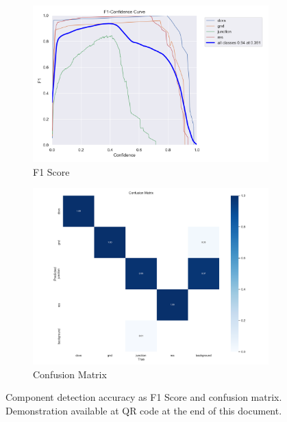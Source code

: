 \documentclass{beamer}
\begin{document}
\begin{frame}[t]
\begin{columns}[t]
\begin{column}{\colwidth}
      {\beamerblocknoheader
        \begin{block}{}
          \begin{figure}[t]
            \centering
            \begin{subfigure}{0.45\textwidth}
              \includegraphics[width=\textwidth]{../common/graphics/poster_F1_curve}
              \caption{F1 Score}
              \label{fig:f1-score for all classes}
            \end{subfigure}
            \begin{subfigure}{0.45\textwidth}
              \includegraphics[width=\textwidth]{../common/graphics/poster_confusion_matrix}
              \caption{Confusion Matrix}
              \label{fig:confusion matrix for all classes}
            \end{subfigure}
            \caption{
              \centering
              Component detection accuracy as F1 Score and confusion matrix.
              Demonstration available at QR code at the end of this document.}
            \label{fig:f1-score-confusion-matrix}
          \end{figure}
        \end{block}
      }


\end{column}
\end{columns}
\end{frame}
\end{document}

